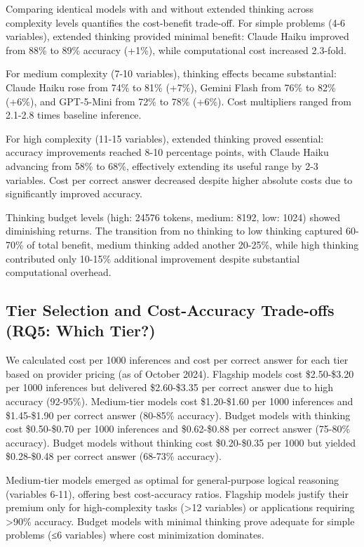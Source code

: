 \documentclass[pdflatex,sn-mathphys-num]{sn-jnl}%
\theoremstyle{thmstyleone}%
\theoremstyle{thmstyletwo}%
\theoremstyle{thmstylethree}%
\begin{document}
Comparing identical models with and without extended thinking across complexity levels quantifies the cost-benefit trade-off. For simple problems (4-6 variables), extended thinking provided minimal benefit: Claude Haiku improved from 88\% to 89\% accuracy (+1\%), while computational cost increased 2.3-fold.

For medium complexity (7-10 variables), thinking effects became substantial: Claude Haiku rose from 74\% to 81\% (+7\%), Gemini Flash from 76\% to 82\% (+6\%), and GPT-5-Mini from 72\% to 78\% (+6\%). Cost multipliers ranged from 2.1-2.8 times baseline inference.

For high complexity (11-15 variables), extended thinking proved essential: accuracy improvements reached 8-10 percentage points, with Claude Haiku advancing from 58\% to 68\%, effectively extending its useful range by 2-3 variables. Cost per correct answer decreased despite higher absolute costs due to significantly improved accuracy.

Thinking budget levels (high: 24576 tokens, medium: 8192, low: 1024) showed diminishing returns. The transition from no thinking to low thinking captured 60-70\% of total benefit, medium thinking added another 20-25\%, while high thinking contributed only 10-15\% additional improvement despite substantial computational overhead.

\subsection{Tier Selection and Cost-Accuracy Trade-offs (RQ5: Which Tier?)}\label{subsec:tiers}

We calculated cost per 1000 inferences and cost per correct answer for each tier based on provider pricing (as of October 2024). Flagship models cost \$2.50-\$3.20 per 1000 inferences but delivered \$2.60-\$3.35 per correct answer due to high accuracy (92-95\%). Medium-tier models cost \$1.20-\$1.60 per 1000 inferences and \$1.45-\$1.90 per correct answer (80-85\% accuracy). Budget models with thinking cost \$0.50-\$0.70 per 1000 inferences and \$0.62-\$0.88 per correct answer (75-80\% accuracy). Budget models without thinking cost \$0.20-\$0.35 per 1000 but yielded \$0.28-\$0.48 per correct answer (68-73\% accuracy).

Medium-tier models emerged as optimal for general-purpose logical reasoning (variables 6-11), offering best cost-accuracy ratios. Flagship models justify their premium only for high-complexity tasks (>12 variables) or applications requiring >90\% accuracy. Budget models with minimal thinking prove adequate for simple problems (≤6 variables) where cost minimization dominates.
\end{document}
